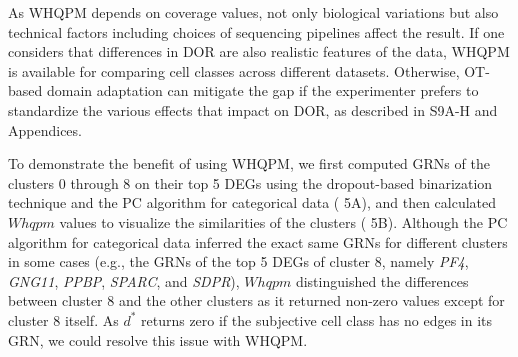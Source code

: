 \documentclass{article}
\begin{document}
As WHQPM depends on coverage values, not only biological variations but also technical factors including 
choices of sequencing pipelines affect the result. If one considers that differences in DOR are also realistic features 
of the data, WHQPM is available for comparing cell classes across different datasets. Otherwise, \ac{OT}-based 
domain adaptation can mitigate the gap if the experimenter prefers to standardize the various effects 
that impact on DOR, as described in \figurename{ S9A-H} and Appendices.

To demonstrate the benefit of using WHQPM, we first computed GRNs of the clusters 0 through 8 on their top 5 DEGs using the dropout-based binarization technique and the PC algorithm for categorical data (\figurename{ 5A}), 
and then calculated $Whqpm$ values to visualize the similarities of the clusters (\figurename{ 5B}). Although the PC algorithm for categorical data inferred the exact same GRNs for different clusters in some cases (e.g., the GRNs of 
the top 5 DEGs of cluster 8, namely \textit{PF4}, \textit{GNG11}, \textit{PPBP}, \textit{SPARC}, and \textit{SDPR}), $Whqpm$ distinguished the differences 
between cluster 8 and the other clusters as it returned non-zero values except for cluster 8 itself. As $d^*$ returns zero 
if the subjective cell class has no edges in its GRN, we could resolve this issue with WHQPM.
\end{document}
